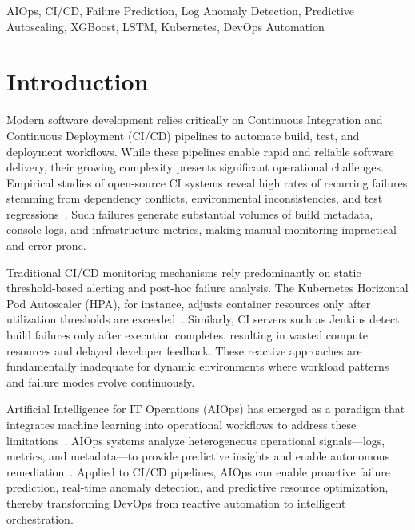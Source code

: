 \documentclass[conference]{IEEEtran}
\begin{document}
\begin{IEEEkeywords}
AIOps, CI/CD, Failure Prediction, Log Anomaly Detection, Predictive Autoscaling, XGBoost, LSTM, Kubernetes, DevOps Automation
\end{IEEEkeywords}

\section{Introduction}

Modern software development relies critically on Continuous Integration and Continuous Deployment (CI/CD) pipelines to automate build, test, and deployment workflows. While these pipelines enable rapid and reliable software delivery, their growing complexity presents significant operational challenges. Empirical studies of open-source CI systems reveal high rates of recurring failures stemming from dependency conflicts, environmental inconsistencies, and test regressions~\cite{rausch2017empirical, beller2017oops}. Such failures generate substantial volumes of build metadata, console logs, and infrastructure metrics, making manual monitoring impractical and error-prone.

Traditional CI/CD monitoring mechanisms rely predominantly on static threshold-based alerting and post-hoc failure analysis. The Kubernetes Horizontal Pod Autoscaler (HPA), for instance, adjusts container resources only after utilization thresholds are exceeded~\cite{kubernetesDocs}. Similarly, CI servers such as Jenkins detect build failures only after execution completes, resulting in wasted compute resources and delayed developer feedback. These reactive approaches are fundamentally inadequate for dynamic environments where workload patterns and failure modes evolve continuously.

Artificial Intelligence for IT Operations (AIOps) has emerged as a paradigm that integrates machine learning into operational workflows to address these limitations~\cite{dang2019aiops}. AIOps systems analyze heterogeneous operational signals---logs, metrics, and metadata---to provide predictive insights and enable autonomous remediation~\cite{notaro2021aiops}. Applied to CI/CD pipelines, AIOps can enable proactive failure prediction, real-time anomaly detection, and predictive resource optimization, thereby transforming DevOps from reactive automation to intelligent orchestration.
\end{document}
